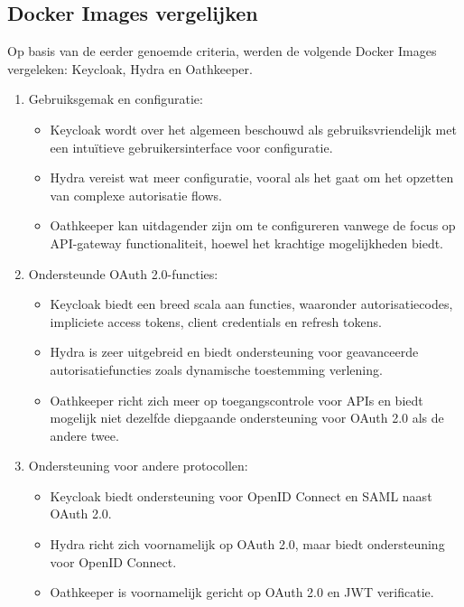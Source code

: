\subsection{Docker Images vergelijken}%
\label{subsec:docker-images-vergelijken}
Op basis van de eerder genoemde criteria, werden de volgende Docker Images vergeleken: Keycloak, Hydra en Oathkeeper.

\begin{enumerate}
  \item Gebruiksgemak en configuratie:
  \begin{itemize}
    \item Keycloak wordt over het algemeen beschouwd als gebruiksvriendelijk met een intuïtieve gebruikersinterface voor configuratie.
    \item Hydra vereist wat meer configuratie, vooral als het gaat om het opzetten van complexe autorisatie flows.
    \item Oathkeeper kan uitdagender zijn om te configureren vanwege de focus op API-gateway functionaliteit, hoewel het krachtige mogelijkheden biedt.
  \end{itemize}
  
  \item Ondersteunde OAuth 2.0-functies:
  \begin{itemize}
    \item Keycloak biedt een breed scala aan functies, waaronder autorisatiecodes, impliciete access tokens, client credentials en refresh tokens.
    \item Hydra is zeer uitgebreid en biedt ondersteuning voor geavanceerde autorisatiefuncties zoals dynamische toestemming verlening.
    \item Oathkeeper richt zich meer op toegangscontrole voor APIs en biedt mogelijk niet dezelfde diepgaande ondersteuning voor OAuth 2.0 als de andere twee.
  \end{itemize}
  
  \item Ondersteuning voor andere protocollen:
  \begin{itemize}
    \item Keycloak biedt ondersteuning voor OpenID Connect en SAML naast OAuth 2.0.
    \item Hydra richt zich voornamelijk op OAuth 2.0, maar biedt ondersteuning voor OpenID Connect.
    \item Oathkeeper is voornamelijk gericht op OAuth 2.0 en JWT verificatie.
  \end{itemize}
  

\end{enumerate}
